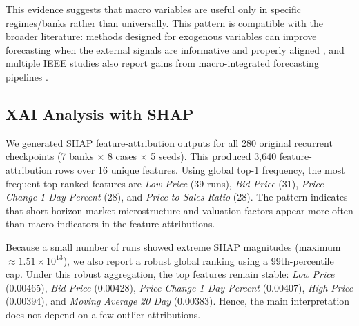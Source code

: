 This evidence suggests that macro variables are useful only in specific regimes/banks rather than universally. This pattern is compatible with the broader literature: methods designed for exogenous variables can improve forecasting when the external signals are informative and properly aligned \cite{wang2024timexer,qiu2025dag_exogenous}, and multiple IEEE studies also report gains from macro-integrated forecasting pipelines \cite{adyatma2022idx_macro,begum2024macro_sentiment_lstm,dechjijaruwate2025thai_banks_external}.

\subsection{XAI Analysis with SHAP}
We generated SHAP feature-attribution outputs for all 280 original recurrent checkpoints (7 banks $\times$ 8 cases $\times$ 5 seeds). This produced 3,640 feature-attribution rows over 16 unique features. Using global top-1 frequency, the most frequent top-ranked features are \textit{Low Price} (39 runs), \textit{Bid Price} (31), \textit{Price Change 1 Day Percent} (28), and \textit{Price to Sales Ratio} (28). The pattern indicates that short-horizon market microstructure and valuation factors appear more often than macro indicators in the feature attributions.

Because a small number of runs showed extreme SHAP magnitudes (maximum $\approx 1.51 \times 10^{13}$), we also report a robust global ranking using a 99th-percentile cap. Under this robust aggregation, the top features remain stable: \textit{Low Price} (0.00465), \textit{Bid Price} (0.00428), \textit{Price Change 1 Day Percent} (0.00407), \textit{High Price} (0.00394), and \textit{Moving Average 20 Day} (0.00383). Hence, the main interpretation does not depend on a few outlier attributions.

\begin{table}[t]
\centering
\caption{Global SHAP summary (robust aggregate over all 280 recurrent runs).}
\label{tab:shap_top_features}
\scriptsize
\setlength{\tabcolsep}{2pt}
\end{table}

